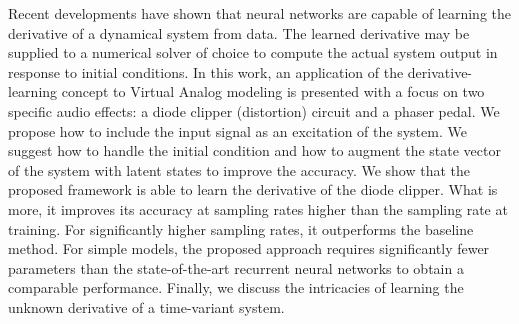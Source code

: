 Recent developments have shown that neural networks are capable of learning the derivative of a dynamical system from data. The learned derivative may be supplied to a numerical solver of choice to compute the actual system output in response to initial conditions. In this work, an application of the derivative-learning concept to Virtual Analog modeling is presented with a focus on two specific audio effects: a diode clipper (distortion) circuit and a phaser pedal. We propose how to include the input signal as an excitation of the system. We suggest how to handle the initial condition and how to augment the state vector of the system with latent states to improve the accuracy. We show that the proposed framework is able to learn the derivative of the diode clipper. What is more, it improves its accuracy at sampling rates higher than the sampling rate at training. For significantly higher sampling rates, it outperforms the baseline method. For simple models, the proposed approach requires significantly fewer parameters than the state-of-the-art recurrent neural networks to obtain a comparable performance. Finally, we discuss the intricacies of learning the unknown derivative of a time-variant system.
